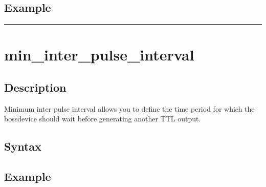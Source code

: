 \documentclass[letterpaper,10pt,english]{sphinxmanual}
\begin{document}
\subsection{Example}
\label{\detokenize{4_api_documentation:id49}}
\begin{sphinxVerbatim}[commandchars=\\\{\}]
\end{sphinxVerbatim}


\bigskip\hrule\bigskip



\section{min\_inter\_pulse\_interval}
\label{\detokenize{4_api_documentation:min-inter-pulse-interval}}

\subsection{Description}
\label{\detokenize{4_api_documentation:id50}}
\sphinxAtStartPar
Minimum inter pulse interval allows you to define the time period for which the bossdevice should wait before generating another TTL output.


\subsection{Syntax}
\label{\detokenize{4_api_documentation:id51}}
\begin{sphinxVerbatim}[commandchars=\\\{\}]
\PYG{p}{[}\PYG{p}{]}
\end{sphinxVerbatim}


\subsection{Example}
\label{\detokenize{4_api_documentation:id52}}
\begin{sphinxVerbatim}[commandchars=\\\{\}]
\end{sphinxVerbatim}
\end{document}
